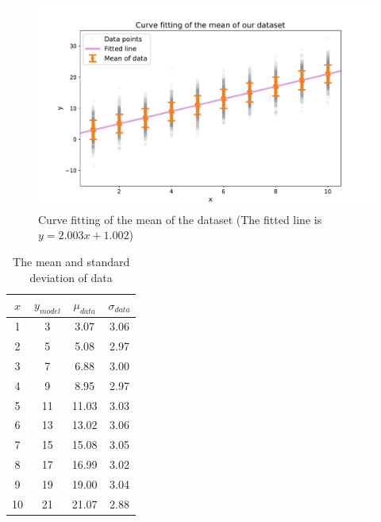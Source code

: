 \documentclass[12pt,a4paper]{article}
\begin{document}
\begin{CJK}{UTF8}{bkai}
\begin{figure}[h]
    \centering
    \includegraphics[width=1\linewidth]{figures/output/practice_3/output3_1.pdf}
    \caption{Curve fitting of the mean of the dataset (The fitted line is $y = 2.003x+1.002$)}
    \label{fig:output_3_1}
\end{figure}


\begin{table}[h]
\centering
\caption{The mean and standard deviation of data}
\label{tab:mean_std}
\vspace{.5cm}
\begin{tabular}{c||c c:c}
$x$ &   $y_{model}$ &   $\mu_{data}$  &   $\sigma_{data}$\\\hline{}   &   3   &   3.07    &   3.06\\
2   &   5   &   5.08    &   2.97\\
3   &   7   &   6.88    &   3.00\\
4   &   9   &   8.95    &   2.97\\
5   &   11  &   11.03   &   3.03\\   
6   &   13  &   13.02   &   3.06\\
7   &   15  &   15.08   &   3.05\\   
8   &   17  &   16.99   &   3.02\\
9   &   19  &   19.00   &   3.04\\
10  &   21  &   21.07   &   2.88\\ 
\end{tabular}
\end{table}


\end{CJK}
\end{document}

